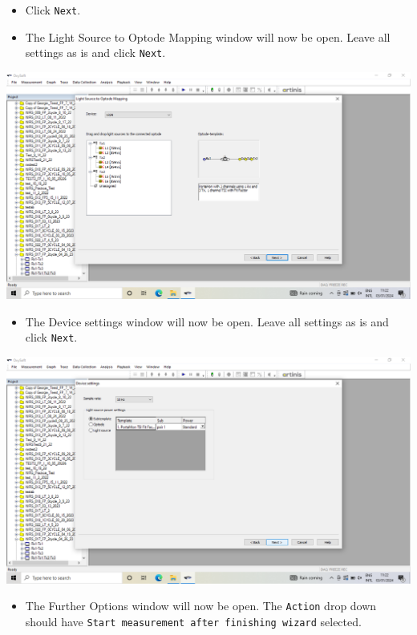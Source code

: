 \documentclass[
]{book}
\providecommand{\tightlist}{%
  \setlength{\itemsep}{0pt}\setlength{\parskip}{0pt}}
\begin{document}
\begin{itemize}
\tightlist
\item
  Click \texttt{Next}.
\item
  The Light Source to Optode Mapping window will now be open. Leave all settings as is and click \texttt{Next}.
\end{itemize}

\includegraphics[width=1\linewidth]{images/startnewmeasurement/13_optodemapping_popup}

\begin{itemize}
\tightlist
\item
  The Device settings window will now be open. Leave all settings as is and click \texttt{Next}.
\end{itemize}

\includegraphics[width=1\linewidth]{images/startnewmeasurement/14_device_settings_popup}

\begin{itemize}
\tightlist
\item
  The Further Options window will now be open. The \texttt{Action} drop down should have \texttt{Start\ measurement\ after\ finishing\ wizard} selected.
\end{itemize}
\end{document}
